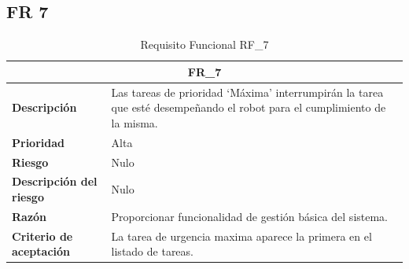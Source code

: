 \documentclass{scrreprt}
\begin{document}
\subsection{FR 7}
\begin{table}[H]
    
    \label{tab:my-table}
    
    \begin{tabular}{|p{5cm}|p{11cm}|}
    \hline
    \multicolumn{2}{|c|}{\textbf{FR_7}} \\
    \hline
    \textbf{Descripción  }                      & Las tareas de prioridad ‘Máxima’ interrumpirán la tarea que esté desempeñando el robot para el cumplimiento de la misma.                                                                          \\ \hline
    \textbf{Prioridad}                          & Alta                                                                                              \\ \hline
    \textbf{Riesgo}                          & Nulo                                                                                                \\ \hline
    \textbf{Descripción del riesgo}                    & Nulo                                                                               \\ \hline
    \textbf{Razón}                   & Proporcionar funcionalidad de gestión básica del sistema.                                                                                               \\ \hline
     \textbf{Criterio de aceptación}                    & La tarea de urgencia maxima aparece la primera en el listado de tareas.  \\ \hline
\end{tabular}%

\caption{Requisito Funcional RF_7}
\end{table}
\end{document}

